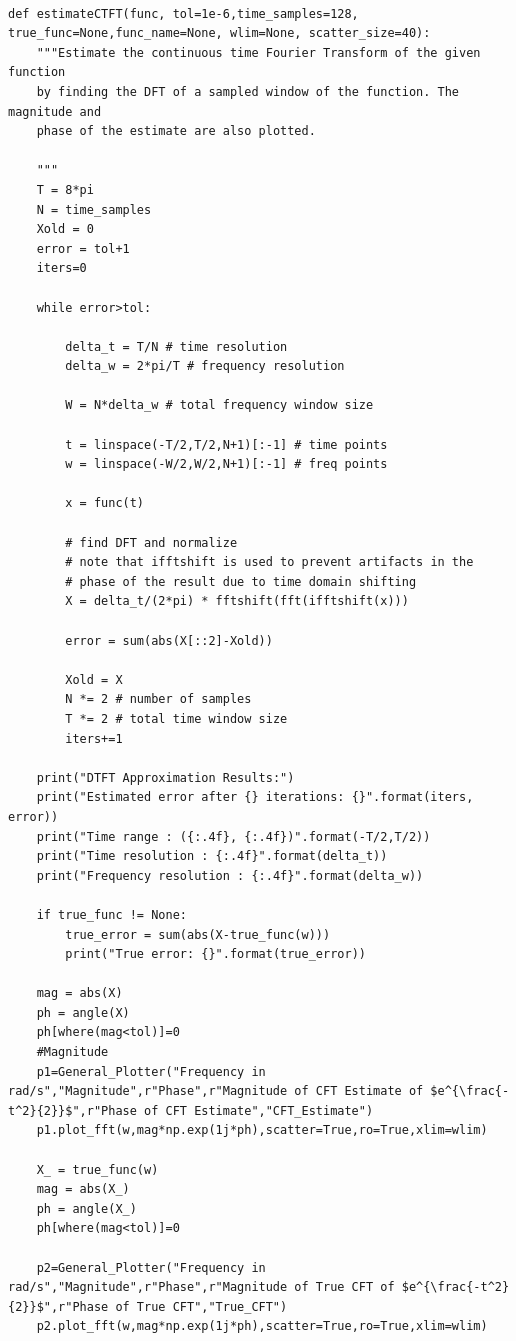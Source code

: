 \documentclass{article}
\begin{document}
\begin{lstlisting}

def estimateCTFT(func, tol=1e-6,time_samples=128, true_func=None,func_name=None, wlim=None, scatter_size=40):
    """Estimate the continuous time Fourier Transform of the given function
    by finding the DFT of a sampled window of the function. The magnitude and
    phase of the estimate are also plotted.
    
    """
    T = 8*pi
    N = time_samples
    Xold = 0
    error = tol+1
    iters=0
    
    while error>tol:
        
        delta_t = T/N # time resolution
        delta_w = 2*pi/T # frequency resolution

        W = N*delta_w # total frequency window size

        t = linspace(-T/2,T/2,N+1)[:-1] # time points
        w = linspace(-W/2,W/2,N+1)[:-1] # freq points

        x = func(t)

        # find DFT and normalize
        # note that ifftshift is used to prevent artifacts in the
        # phase of the result due to time domain shifting
        X = delta_t/(2*pi) * fftshift(fft(ifftshift(x)))
        
        error = sum(abs(X[::2]-Xold))
        
        Xold = X
        N *= 2 # number of samples
        T *= 2 # total time window size
        iters+=1
        
    print("DTFT Approximation Results:")    
    print("Estimated error after {} iterations: {}".format(iters, error))
    print("Time range : ({:.4f}, {:.4f})".format(-T/2,T/2))
    print("Time resolution : {:.4f}".format(delta_t))
    print("Frequency resolution : {:.4f}".format(delta_w))
        
    if true_func != None:
        true_error = sum(abs(X-true_func(w)))
        print("True error: {}".format(true_error))
    
    mag = abs(X)
    ph = angle(X)
    ph[where(mag<tol)]=0
    #Magnitude
    p1=General_Plotter("Frequency in rad/s","Magnitude",r"Phase",r"Magnitude of CFT Estimate of $e^{\frac{-t^2}{2}}$",r"Phase of CFT Estimate","CFT_Estimate")
    p1.plot_fft(w,mag*np.exp(1j*ph),scatter=True,ro=True,xlim=wlim)
    
    X_ = true_func(w)    
    mag = abs(X_)
    ph = angle(X_)
    ph[where(mag<tol)]=0
    
    p2=General_Plotter("Frequency in rad/s","Magnitude",r"Phase",r"Magnitude of True CFT of $e^{\frac{-t^2}{2}}$",r"Phase of True CFT","True_CFT")
    p2.plot_fft(w,mag*np.exp(1j*ph),scatter=True,ro=True,xlim=wlim)

\end{lstlisting}
\end{document}
